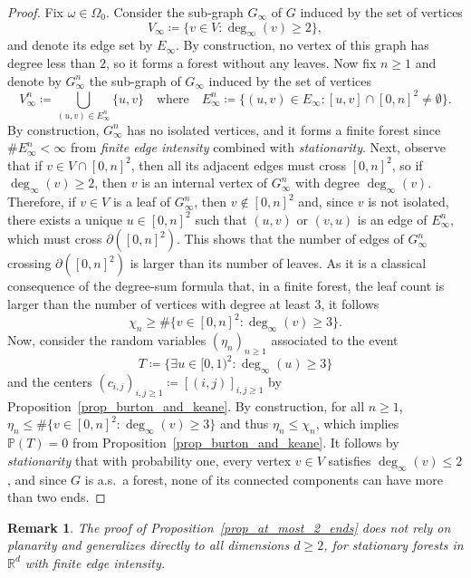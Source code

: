 \documentclass[a4paper, 11pt]{article} %
\theoremstyle{plain}
\newtheorem{remark}[theorem]{Remark}
\newcommand{\R}{\mathbb{R}}
\newcommand{\1}{\mathds 1}
\renewcommand{\P}{\mathbb{P}}
\numberwithin{equation}{section}
\begin{document}
\begin{proof}
    Fix $\omega\in\Omega_0$. Consider the sub-graph $G_\infty$ of $G$ induced by the set of vertices 
        \[V_\infty\coloneqq\{v\in V:\deg_\infty(v)\geq2\},\]
    and denote its edge set by $E_\infty$. By construction, no vertex of this graph has degree less than $2$, so it forms a forest without any leaves. Now fix $n\geq 1$ and denote by $G_\infty^n$ the sub-graph of $G_\infty$ induced by the set of vertices
        \[V_\infty^n\coloneqq\bigcup_{(u, v)\in E_\infty^n}\{u,v\}\quad\text{where}\quad E_\infty^n\coloneqq\{(u,v)\in E_\infty:[u,v]\cap[0,n]^2\neq\emptyset\}.\]
    By construction, $G_\infty^n$ has no isolated vertices, and it forms a finite forest since $\#E_\infty^n<\infty$ from \emph{finite edge intensity} combined with \emph{stationarity}. Next, observe that if $v\in V\cap[0,n]^2$, then all its adjacent edges must cross $[0,n]^2$, so if $\deg_\infty(v)\geq2$, then $v$ is an internal vertex of $G_\infty^n$ with degree $\deg_\infty(v)$. Therefore, if $v\in V$ is a leaf of $G_\infty^n$, then $v\notin[0,n]^2$ and, since $v$ is not isolated, there exists a unique $u\in[0,n]^2$ such that $(u,v)$ or $(v,u)$ is an edge of $E_\infty^n$, which must cross $\partial([0,n]^2)$. This shows that the number of edges of $G_\infty^n$ crossing $\partial([0,n]^2)$ is larger than its number of leaves. As it is a classical consequence of the degree-sum formula that, in a finite forest, the leaf count is larger than the number of vertices with degree at least 3, it follows
        \[\chi_n\geq\#\{v\in[0,n]^2:\deg_\infty(v)\geq 3\}.\]
    Now, consider the random variables $(\eta_n)_{n\geq 1}$ associated to the event 
        \begin{equation}
            \label{eq_trifurcation_1}
            T\coloneqq\{\exists u\in[0,1)^2:\deg_\infty(u)\geq3\}
        \end{equation}
    and the centers $(c_{i, j})_{i,j\geq1}\coloneqq[(i, j)]_{i, j\geq1}$ by Proposition~\ref{prop_burton_and_keane}. By construction, for all $n\geq 1$, $\eta_n\leq\#\{v\in[0,n]^2:\deg_\infty(v)\geq 3\}$ and thus $\eta_n\leq\chi_n$, which implies $\P(T)=0$ from Proposition~\ref{prop_burton_and_keane}. It follows by \emph{stationarity} that with probability one, every vertex $v\in V$ satisfies $\deg_\infty(v)\leq 2$, and since $G$ is a.s.\ a forest, none of its connected components can have more than two ends.
\end{proof}


\begin{remark}
    The proof of Proposition~\ref{prop_at_most_2_ends} does not rely on \emph{planarity} and generalizes directly to all dimensions $d\geq2$, for stationary forests in $\R^d$ with finite edge intensity.
\end{remark}
\end{document}

